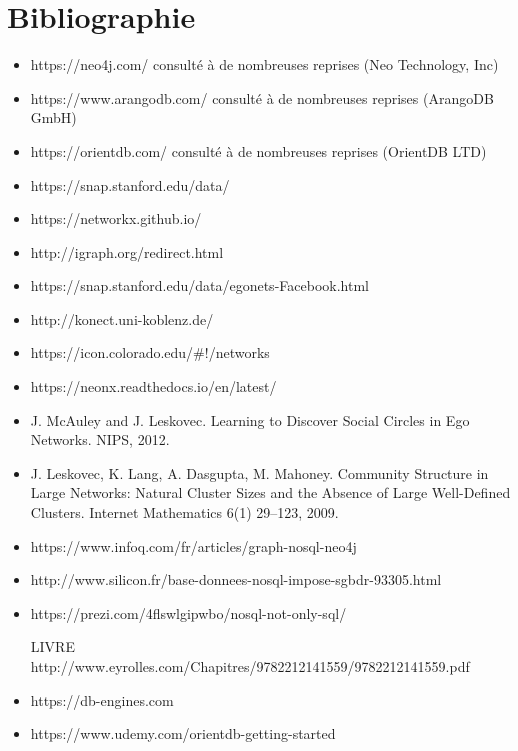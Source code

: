 \documentclass[a4paper,fleqn,12pt]{report}
\begin{document}
\chapter{Bibliographie}
\begin{itemize}
\item https://neo4j.com/ consulté à de nombreuses reprises (Neo Technology, Inc)
\item https://www.arangodb.com/ consulté à de nombreuses reprises (ArangoDB GmbH)
\item https://orientdb.com/ consulté à de nombreuses reprises (OrientDB LTD)
\item https://snap.stanford.edu/data/
\item https://networkx.github.io/
\item http://igraph.org/redirect.html
\item https://snap.stanford.edu/data/egonets-Facebook.html
\item http://konect.uni-koblenz.de/
\item https://icon.colorado.edu/\#!/networks
\item https://neonx.readthedocs.io/en/latest/
\item J. McAuley and J. Leskovec. Learning to Discover Social Circles in Ego Networks. NIPS, 2012.
\item J. Leskovec, K. Lang, A. Dasgupta, M. Mahoney. Community Structure in Large Networks: Natural Cluster Sizes and the Absence of Large Well-Defined Clusters. Internet Mathematics 6(1) 29--123, 2009.
\item https://www.infoq.com/fr/articles/graph-nosql-neo4j
\item http://www.silicon.fr/base-donnees-nosql-impose-sgbdr-93305.html
\item https://prezi.com/4flswlgipwbo/nosql-not-only-sql/
\item [LIVRE] http://www.eyrolles.com/Chapitres/9782212141559/9782212141559.pdf
\item https://db-engines.com
\item https://www.udemy.com/orientdb-getting-started
\end{itemize}
\end{document}
